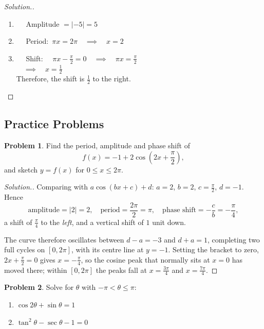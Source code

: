 \documentclass[11pt,a4paper]{article}
\theoremstyle{definition}
\newtheorem{problemx}{Problem}[section]
\newenvironment{problem}{\begin{problemx}}{\end{problemx}}
\newenvironment{solution}
  {\renewcommand{\qedsymbol}{}\begin{proof}[\textit{Solution}.]}
  {\end{proof}}
\begin{document}
\begin{solution}

\begin{enumerate}
\item[] $\quad $ Amplitude $ = \left|-5\right| = 5$\\


\item[] $\quad $ Period: $\, \pi x = 2\pi \quad \implies \quad  x = 2$\\


\item[] $\quad $ Shift: $\quad  \pi x - \frac{\pi}{2} = 0 \quad  \implies \quad  \pi x = \frac{\pi}{2}$\\

$\quad  \implies \quad  x = \frac{1}{2}$\\

Therefore, the shift is $\frac{1}{2}$ to the right.
\end{enumerate}
\end{solution}
\pagebreak

\subsection{Practice Problems}

\begin{problem}
Find the period, amplitude and phase shift of
$$f(x)=-1+2\cos\left(2x+\frac{\pi}{2}\right),$$
and sketch $y=f(x)$ for $0\leq x\leq 2\pi$.
\end{problem}

\begin{solution}
Comparing with $a\cos(bx+c)+d$: $a=2$, $b=2$, $c=\frac{\pi}{2}$, $d=-1$. Hence
$$\text{amplitude}=\left|2\right|=2,\quad 
\text{period}=\frac{2\pi}{2}=\pi,\quad 
\text{phase shift}=-\frac{c}{b}=-\frac{\pi}{4},$$
a shift of $\frac{\pi}{4}$ to the \emph{left}, and a vertical shift of $1$ unit
down.

The curve therefore oscillates between $d-a=-3$ and $d+a=1$, completing two full
cycles on $[0,2\pi]$, with its centre line at $y=-1$. Setting the bracket to zero,
$2x+\frac{\pi}{2}=0$ gives $x=-\frac{\pi}{4}$, so the cosine peak that normally
sits at $x=0$ has moved there; within $[0,2\pi]$ the peaks fall at
$x=\frac{3\pi}{4}$ and $x=\frac{7\pi}{4}$.
\end{solution}

\begin{problem}
Solve for $\theta$ with $-\pi<\theta\leq\pi$:
\begin{enumerate}
\item[(a).] $\cos 2\theta+\sin\theta=1$
\item[(b).] $\tan^{2}\theta-\sec\theta-1=0$
\end{enumerate}
\end{problem}
\end{document}
